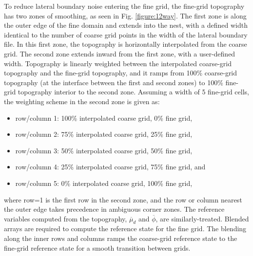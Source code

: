 To reduce lateral boundary noise entering the fine grid, the fine-grid topography has two 
zones of smoothing, as seen in Fig. \ref{figure:12way}.
The first zone is along the outer edge of the fine domain and 
extends into the nest, with a defined width identical to the number of coarse grid points
in the width of the lateral boundary file.  In this first zone, the topography is horizontally
interpolated from the coarse grid.  The second zone extends inward from the first zone, with a
user-defined width.  Topography is linearly weighted between the interpolated coarse-grid
topography and the fine-grid topography, and it ramps from 100\% coarse-grid 
topography (at the interface between the 
first and second zones) to 100\%
fine-grid topography interior to the second zone.  
\noindent
Assuming a width of 5 fine-grid cells, the weighting scheme in the second zone is given as:
\begin{itemize}\setlength{\parskip}{-4pt}
\item row/column 1: 100\% interpolated coarse grid, 0\% fine grid,
\item row/column 2: 75\% interpolated coarse grid, 25\% fine grid,
\item row/column 3: 50\% interpolated coarse grid, 50\% fine grid,
\item row/column 4: 25\% interpolated coarse grid, 75\% fine grid, and
\item row/column 5: 0\% interpolated coarse grid, 100\% fine grid,
\end{itemize}
\noindent 
where row=1 is the first row in the second zone, and the row or column 
nearest the outer edge takes precedence in ambiguous corner zones.  
The reference variables computed from the topography,
$\overline{\mu}_d$ and $\overline{\phi}$, are similarly-treated.
Blended arrays are required to compute the reference state for the
fine grid.  The blending along the inner rows and columns ramps the 
coarse-grid reference state to the
fine-grid reference state for a smooth transition between grids.

